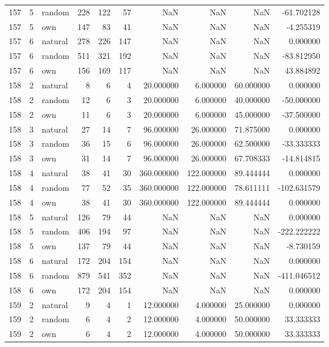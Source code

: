 \begin{table}[htbp]
\begin{tabular}{rrlrrrrrrr}
157 & 5 & random & 228 & 122 & 57 & NaN & NaN & NaN & -61.702128 \\
157 & 5 & own & 147 & 83 & 41 & NaN & NaN & NaN & -4.255319 \\
157 & 6 & natural & 278 & 226 & 147 & NaN & NaN & NaN & 0.000000 \\
157 & 6 & random & 511 & 321 & 192 & NaN & NaN & NaN & -83.812950 \\
157 & 6 & own & 156 & 169 & 117 & NaN & NaN & NaN & 43.884892 \\
158 & 2 & natural & 8 & 6 & 4 & 20.000000 & 6.000000 & 60.000000 & 0.000000 \\
158 & 2 & random & 12 & 6 & 3 & 20.000000 & 6.000000 & 40.000000 & -50.000000 \\
158 & 2 & own & 11 & 6 & 3 & 20.000000 & 6.000000 & 45.000000 & -37.500000 \\
158 & 3 & natural & 27 & 14 & 7 & 96.000000 & 26.000000 & 71.875000 & 0.000000 \\
158 & 3 & random & 36 & 15 & 6 & 96.000000 & 26.000000 & 62.500000 & -33.333333 \\
158 & 3 & own & 31 & 14 & 7 & 96.000000 & 26.000000 & 67.708333 & -14.814815 \\
158 & 4 & natural & 38 & 41 & 30 & 360.000000 & 122.000000 & 89.444444 & 0.000000 \\
158 & 4 & random & 77 & 52 & 35 & 360.000000 & 122.000000 & 78.611111 & -102.631579 \\
158 & 4 & own & 38 & 41 & 30 & 360.000000 & 122.000000 & 89.444444 & 0.000000 \\
158 & 5 & natural & 126 & 79 & 44 & NaN & NaN & NaN & 0.000000 \\
158 & 5 & random & 406 & 194 & 97 & NaN & NaN & NaN & -222.222222 \\
158 & 5 & own & 137 & 79 & 44 & NaN & NaN & NaN & -8.730159 \\
158 & 6 & natural & 172 & 204 & 154 & NaN & NaN & NaN & 0.000000 \\
158 & 6 & random & 879 & 541 & 352 & NaN & NaN & NaN & -411.046512 \\
158 & 6 & own & 172 & 204 & 154 & NaN & NaN & NaN & 0.000000 \\
159 & 2 & natural & 9 & 4 & 1 & 12.000000 & 4.000000 & 25.000000 & 0.000000 \\
159 & 2 & random & 6 & 4 & 2 & 12.000000 & 4.000000 & 50.000000 & 33.333333 \\
159 & 2 & own & 6 & 4 & 2 & 12.000000 & 4.000000 & 50.000000 & 33.333333 \\

\end{tabular}
\end{table}
